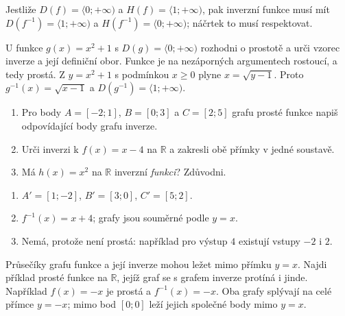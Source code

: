 \documentclass[11pt,a4paper]{article}
\begin{document}
Jestliže $D(f)=\langle0;+\infty)$ a $H(f)=\langle1;+\infty)$, pak inverzní funkce musí mít $D(f^{-1})=\langle1;+\infty)$ a $H(f^{-1})=\langle0;+\infty)$; náčrtek to musí respektovat.

\begin{prikladReseniBox}[title={Příklad 2}]
U funkce $g(x)=x^2+1$ s $D(g)=\langle0;+\infty)$ rozhodni o prostotě a urči vzorec inverze a její definiční obor.
\tcblower
Funkce je na nezáporných argumentech rostoucí, a tedy prostá. Z $y=x^2+1$ s podmínkou $x\ge0$ plyne $x=\sqrt{y-1}$. Proto $g^{-1}(x)=\sqrt{x-1}$ a $D(g^{-1})=\langle1;+\infty)$.
\end{prikladReseniBox}


\begin{zadaniReseniBox}[title={Samostatná práce 1}]
\begin{enumerate}[label=\alph*)]
\item Pro body $A=[-2;1]$, $B=[0;3]$ a $C=[2;5]$ grafu prosté funkce napiš odpovídající body grafu inverze.
\item Urči inverzi k $f(x)=x-4$ na $\mathbb R$ a zakresli obě přímky v jedné soustavě.
\item Má $h(x)=x^2$ na $\mathbb R$ inverzní \emph{funkci}? Zdůvodni.
\end{enumerate}
\tcblower
\begin{enumerate}[label=\alph*)]
\item $A'=[1;-2]$, $B'=[3;0]$, $C'=[5;2]$.
\item $f^{-1}(x)=x+4$; grafy jsou souměrné podle $y=x$.
\item Nemá, protože není prostá: například pro výstup $4$ existují vstupy $-2$ i $2$.
\end{enumerate}
\end{zadaniReseniBox}

\begin{zadaniReseniBox}[title={Rozšíření 1}]
Průsečíky grafu funkce a její inverze mohou ležet mimo přímku $y=x$. Najdi příklad prosté funkce na $\mathbb R$, jejíž graf se s grafem inverze protíná i jinde.
\tcblower
Například $f(x)=-x$ je prostá a $f^{-1}(x)=-x$. Oba grafy splývají na celé přímce $y=-x$; mimo bod $[0;0]$ leží jejich společné body mimo $y=x$.
\end{zadaniReseniBox}
\end{document}

